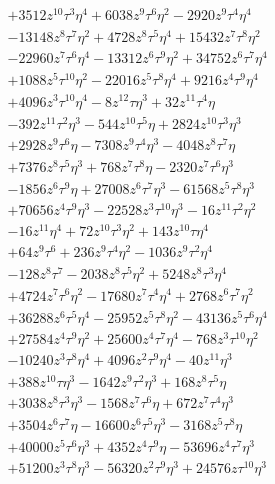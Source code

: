 {\begin{align*}
&+3512z^{10}\tau^{3}\eta^{4}+6038z^{9}\tau^{6}\eta^{2}-2920z^{9}\tau^{4}\eta^{4}\\
&-13148z^{8}\tau^{7}\eta^{2}+4728z^{8}\tau^{5}\eta^{4}+15432z^{7}\tau^{8}\eta^{2}\\
&-22960z^{7}\tau^{6}\eta^{4}-13312z^{6}\tau^{9}\eta^{2}+34752z^{6}\tau^{7}\eta^{4}\\
&+1088z^{5}\tau^{10}\eta^{2}-22016z^{5}\tau^{8}\eta^{4}+9216z^{4}\tau^{9}\eta^{4}\\
&+4096z^{3}\tau^{10}\eta^{4}-8z^{12}\tau\eta^{3}+32z^{11}\tau^{4}\eta\\
&-392z^{11}\tau^{2}\eta^{3}-544z^{10}\tau^{5}\eta+2824z^{10}\tau^{3}\eta^{3}\\
&+2928z^{9}\tau^{6}\eta-7308z^{9}\tau^{4}\eta^{3}-4048z^{8}\tau^{7}\eta\\
&+7376z^{8}\tau^{5}\eta^{3}+768z^{7}\tau^{8}\eta-2320z^{7}\tau^{6}\eta^{3}\\
&-1856z^{6}\tau^{9}\eta+27008z^{6}\tau^{7}\eta^{3}-61568z^{5}\tau^{8}\eta^{3}\\
&+70656z^{4}\tau^{9}\eta^{3}-22528z^{3}\tau^{10}\eta^{3}-16z^{11}\tau^{2}\eta^{2}\\
&-16z^{11}\eta^{4}+72z^{10}\tau^{3}\eta^{2}+143z^{10}\tau\eta^{4}\\
&+64z^{9}\tau^{6}+236z^{9}\tau^{4}\eta^{2}-1036z^{9}\tau^{2}\eta^{4}\\
&-128z^{8}\tau^{7}-2038z^{8}\tau^{5}\eta^{2}+5248z^{8}\tau^{3}\eta^{4}\\
&+4724z^{7}\tau^{6}\eta^{2}-17680z^{7}\tau^{4}\eta^{4}+2768z^{6}\tau^{7}\eta^{2}\\
&+36288z^{6}\tau^{5}\eta^{4}-25952z^{5}\tau^{8}\eta^{2}-43136z^{5}\tau^{6}\eta^{4}\\
&+27584z^{4}\tau^{9}\eta^{2}+25600z^{4}\tau^{7}\eta^{4}-768z^{3}\tau^{10}\eta^{2}\\
&-10240z^{3}\tau^{8}\eta^{4}+4096z^{2}\tau^{9}\eta^{4}-40z^{11}\eta^{3}\\
&+388z^{10}\tau\eta^{3}-1642z^{9}\tau^{2}\eta^{3}+168z^{8}\tau^{5}\eta\\
&+3038z^{8}\tau^{3}\eta^{3}-1568z^{7}\tau^{6}\eta+672z^{7}\tau^{4}\eta^{3}\\
&+3504z^{6}\tau^{7}\eta-16600z^{6}\tau^{5}\eta^{3}-3168z^{5}\tau^{8}\eta\\
&+40000z^{5}\tau^{6}\eta^{3}+4352z^{4}\tau^{9}\eta-53696z^{4}\tau^{7}\eta^{3}\\
&+51200z^{3}\tau^{8}\eta^{3}-56320z^{2}\tau^{9}\eta^{3}+24576z\tau^{10}\eta^{3}\\

\end{align*}}
